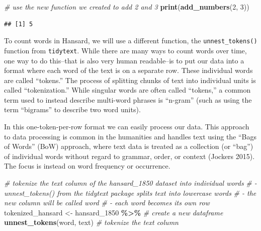 \documentclass[
]{article}
\newenvironment{Shaded}{\begin{snugshade}}{\end{snugshade}}
\newcommand{\CommentTok}[1]{\textcolor[rgb]{0.56,0.35,0.01}{\textit{#1}}}
\newcommand{\DecValTok}[1]{\textcolor[rgb]{0.00,0.00,0.81}{#1}}
\newcommand{\FunctionTok}[1]{\textcolor[rgb]{0.13,0.29,0.53}{\textbf{#1}}}
\newcommand{\NormalTok}[1]{#1}
\newcommand{\OtherTok}[1]{\textcolor[rgb]{0.56,0.35,0.01}{#1}}
\newcommand{\SpecialCharTok}[1]{\textcolor[rgb]{0.81,0.36,0.00}{\textbf{#1}}}
\begin{document}
\begin{Shaded}
\begin{Highlighting}[]
\CommentTok{\# use the new function we created to add 2 and 3}
\FunctionTok{print}\NormalTok{(}\FunctionTok{add\_numbers}\NormalTok{(}\DecValTok{2}\NormalTok{, }\DecValTok{3}\NormalTok{))}
\end{Highlighting}
\end{Shaded}

\begin{verbatim}
## [1] 5
\end{verbatim}

To count words in Hansard, we will use a different function, the
\texttt{unnest\_tokens()} function from \texttt{tidytext}. While there
are many ways to count words over time, one way to do this--that is also
very human readable--is to put our data into a format where each word of
the text is on a separate row. These individual words are called
``tokens.'' The process of splitting chunks of text into individual
units is called ``tokenization.'' While singular words are often called
``tokens,'' a common term used to instead describe multi-word phrases is
``n-gram'' (such as using the term ``bigrams'' to describe two word
units).

In this one-token-per-row format we can easily process our data. This
approach to data processing is common in the humanities and handles text
using the ``Bags of Words'' (BoW) approach, where text data is treated
as a collection (or ``bag'') of individual words without regard to
grammar, order, or context (Jockers 2015). The focus is instead on word
frequency or occurrence.

\begin{Shaded}
\begin{Highlighting}[]
\CommentTok{\# tokenize the \textquotesingle{}text\textquotesingle{} column of the hansard\_1850 dataset into individual words}
\CommentTok{\# {-} \textquotesingle{}unnest\_tokens()\textquotesingle{} from the \textquotesingle{}tidytext\textquotesingle{} package splits text into lowercase words}
\CommentTok{\# {-} the new column will be called \textquotesingle{}word\textquotesingle{}}
\CommentTok{\# {-} each word becomes its own row }
\NormalTok{tokenized\_hansard }\OtherTok{\textless{}{-}}\NormalTok{ hansard\_1850 }\SpecialCharTok{\%\textgreater{}\%} \CommentTok{\# create a new dataframe}
  \FunctionTok{unnest\_tokens}\NormalTok{(word, text) }\CommentTok{\# tokenize the \textquotesingle{}text\textquotesingle{} column }
\end{Highlighting}
\end{Shaded}
\end{document}
